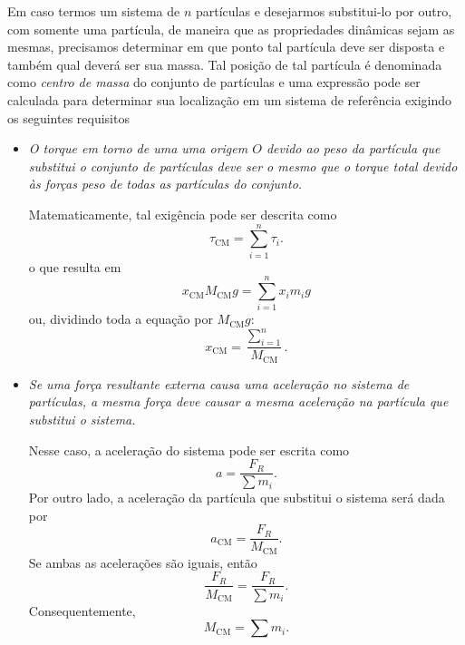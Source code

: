 Em caso termos um sistema de $n$ partículas e desejarmos substitui-lo por outro, com somente uma partícula, de maneira que as propriedades dinâmicas sejam as mesmas, precisamos determinar em que ponto tal partícula deve ser disposta e também qual deverá ser sua massa. Tal posição de tal partícula é denominada como \emph{centro de massa} do conjunto de partículas e uma expressão pode ser calculada para determinar sua localização em um sistema de referência exigindo os seguintes requisitos
\begin{itemize}
  \item \emph{O torque em torno de uma uma origem $O$ devido ao peso da partícula que substitui o conjunto de partículas deve ser o mesmo que o torque total devido às forças peso de todas as partículas do conjunto.} 
  
  Matematicamente, tal exigência pode ser descrita como
    \begin{equation}
      \tau_{\textrm{CM}} = \sum_{i=1}^{n} \tau_i.
    \end{equation}
    o que resulta em
    \begin{equation}
      x_{\textrm{CM}} M_{\textrm{CM}} g = \sum_{i=1}^{n} x_i m_i g
    \end{equation}
    ou, dividindo toda a equação por $M_{\textrm{CM}}g$:
    \begin{equation}
      x_{\textrm{CM}} = \frac{\sum_{i=1}^{n}}{M_{\textrm{CM}}}.
    \end{equation}
    
  \item \emph{Se uma força resultante externa causa uma aceleração no sistema de partículas, a mesma força deve causar a mesma aceleração na partícula que substitui o sistema.} 
  
  Nesse caso, a aceleração do sistema pode ser escrita como
  \begin{equation}
    a = \frac{F_R}{\sum m_i}.
  \end{equation}
  Por outro lado, a aceleração da partícula que substitui o sistema será dada por
  \begin{equation}
    a_{\textrm{CM}} = \frac{F_R}{M_{\textrm{CM}}}.
  \end{equation}
  Se ambas as acelerações são iguais, então
  \begin{equation}
    \frac{F_R}{M_{\textrm{CM}}} = \frac{F_R}{\sum m_i}.
  \end{equation}
  Consequentemente,
  \begin{equation}
    M_{\textrm{CM}} = \sum m_i.
  \end{equation}
\end{itemize}

